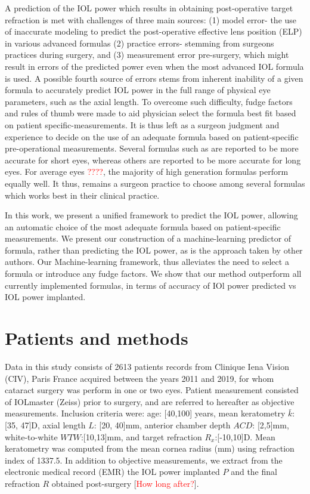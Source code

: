 \documentclass[article,twocolumn,preprint,10pt]{paper}%
\renewcommand{\(}{\left(}
\renewcommand{\)}{\right)}
\renewcommand{\[}{\left[}
\renewcommand{\]}{\right]}
\newcommand{\red}{\textcolor{red}}
\newcommand{\1}{\mbox{\boldmath$1$}}
\begin{document}
A prediction of the IOL power which results in obtaining post-operative target refraction is met with challenges of three main sources: (1) model error- the use of inaccurate modeling to predict the post-operative effective lens position (ELP) in various advanced formulas (2) practice errors- stemming from surgeons practices during surgery, and (3) measurement error pre-surgery, which might result in errors of the predicted power even when  the most advanced IOL formula is used. 
A possible fourth source of errors stems from inherent inability of a given formula to accurately predict IOL power in the full range of physical eye parameters, such as the axial length. To overcome such difficulty, fudge factors and rules of thumb were made to aid physician select the formula best fit based on patient specific-measurements. It is thus left as a surgeon judgment and experience to decide on the use of an adequate formula based on patient-specific pre-operational measurements. Several formulas such as \cite{??} are reported to be more accurate for short eyes, whereas others \cite{???} are reported to be more accurate for long eyes. For average eyes \red{????}, the majority of high generation formulas perform equally well. It thus, remains a surgeon practice to choose among several formulas which works best in their clinical practice. 

In this work, we present a unified framework to predict the IOL power, allowing an automatic choice of the most adequate formula based on patient-specific measurements. We present our construction of a machine-learning predictor of formula, rather than predicting the IOL power, as is the approach taken by other authors. Our Machine-learning framework, thus alleviates the need to select a formula or introduce any fudge factors. We show that our method outperform all currently implemented formulas, in terms of accuracy of IOl power predicted vs IOL power implanted. 

\section{Patients and methods}\label{section:patientAndMethods}
Data in this study consists of 2613 patients records from Clinique Iena Vision (CIV), Paris France acquired between the years 2011 and 2019, for whom cataract surgery was perform in one or two eyes. Patient measurement consisted of IOLmaster (Zeiss) prior to surgery, and are referred to hereafter as objective measurements. 
Inclusion criteria were: age: [40,100] years, mean keratometry $\bar{k}$: [35, 47]D, axial length $L$: [20, 40]mm, anterior chamber depth $ACD$: [2,5]mm, white-to-white $WTW$:[10,13]mm, and target refraction $R_x$:[-10,10]D. Mean keratometry was computed from the mean cornea radius (mm) using refraction index of 1337.5. In addition to objective measurements, we extract from the electronic medical record (EMR) the IOL power implanted $P$ and the final refraction $R$ obtained post-surgery [\red{How long after?}].
\end{document}
